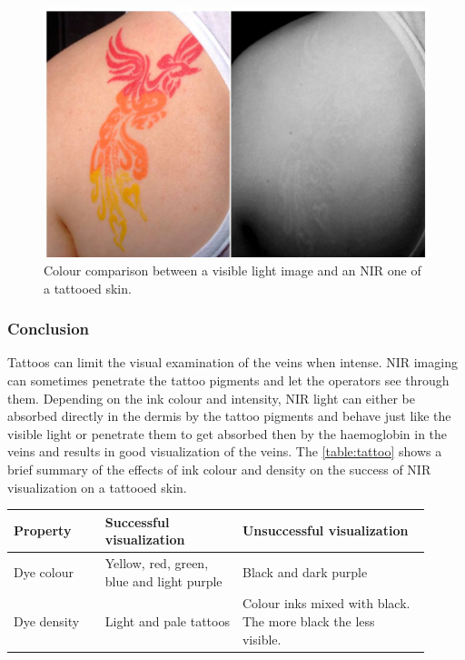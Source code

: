 \begin{figure}[H]
\centering
\includegraphics[scale=0.6]{figures/tattoo2.JPG}
\caption[Colour comparison between a visible light image and an NIR one of a tattooed skin]{Colour comparison between a visible light image and an NIR one of a tattooed skin.  }\label{fig:tattoo2}
\end{figure}


\subsubsection{Conclusion}

Tattoos can limit the visual examination of the veins when intense. NIR imaging can sometimes penetrate the tattoo pigments and let the operators see through them. Depending on the ink colour and intensity, NIR light can either be absorbed directly in the dermis by the tattoo pigments and behave just like the visible light or penetrate them to get absorbed then by the haemoglobin in the veins and results in good visualization of the veins. The \autoref{table:tattoo} \parencite{tatto} shows a brief summary of the effects of ink colour and density on the success of NIR visualization on a tattooed skin.


\begin{table}[H]
\setlength\extrarowheight{7pt}
\begin{tabular}{ | p{0.2\linewidth} | p{0.3\linewidth}| p{0.41\linewidth} |}
Property&Successful visualization&Unsuccessful visualization\\ \hline
Dye colour&Yellow, red, green, blue and light purple&Black and dark purple\\ \hline
Dye density& Light and pale tattoos & Colour	inks mixed with black.	The more black the less visible. \\ \hline
\end{tabular}
 \label{table:tattoo} 
\end{table}

